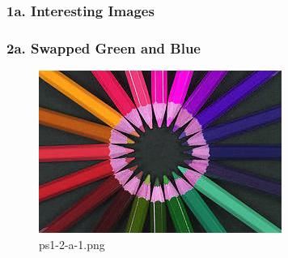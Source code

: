	\begin{frame}
		\frametitle{1a. Interesting Images}
		
		\begin{figure}[!htb]
			\centering
			 \hspace{3em}
		\end{figure}	
		
	\end{frame}
	
	\begin{frame}
		\frametitle{2a. Swapped Green and Blue}
		
		\begin{figure}[!htb]
			\centering
			\includegraphics[height=0.65\textheight]{./output/ps1-2-a-1.png}
			\caption{ps1-2-a-1.png} 
		\end{figure}	
		
	\end{frame}

